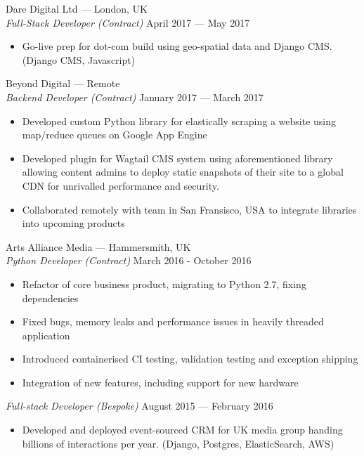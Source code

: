 \documentclass[margin, 10pt]{res}
\begin{document}
\begin{resume}
Dare Digital Ltd --- London, UK \\
{\sl Full-Stack Developer (Contract)} \hfill April 2017 --- May 2017 \\
\begin{itemize} \itemsep -1pt
\item Go-live prep for dot-com build using geo-spatial data and Django CMS. (Django CMS, Javascript)
\end{itemize}

Beyond Digital --- Remote \\
{\sl Backend Developer (Contract)} \hfill January 2017 --- March 2017 \\

\begin{itemize} \itemsep -1pt
\item Developed custom Python library for elastically scraping a website using map/reduce queues on Google App Engine
\item Developed plugin for Wagtail CMS system using aforementioned library allowing content admins to deploy static snapshots of their site to a global CDN for unrivalled performance and security.
\item Collaborated remotely with team in San Fransisco, USA to integrate libraries into upcoming products
\end{itemize}

Arts Alliance Media --- Hammersmith, UK \\
{\sl Python Developer (Contract)} \hfill March 2016 - October 2016 \\

\begin{itemize} \itemsep -1pt
\item Refactor of core business product, migrating to Python 2.7, fixing dependencies
\item Fixed bugs, memory leaks and performance issues in heavily threaded application
\item Introduced containerised CI testing, validation testing and exception shipping
\item Integration of new features, including support for new hardware
\end{itemize}

{\sl Full-stack Developer (Bespoke)} \hfill August 2015 --- February 2016 \\

\begin{itemize}
\item Developed and deployed event-sourced CRM for UK media group handing billions of
interactions per year. (Django, Postgres, ElasticSearch, AWS)
\end{itemize}


\end{resume}
\end{document}
